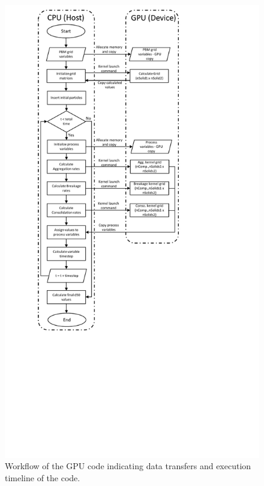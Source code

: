 \documentclass[preprint,10pt,authoryear,review]{elsarticle}
\begin{document}
\begin{linenumbers}
\begin{figure}
\centering
\includegraphics[scale=0.8,trim=200 250 300 200]{GPU_flowchart.pdf}
\caption{Workflow of the GPU code indicating data transfers and execution timeline of the code.}
\label{fig:mtd_gpu_imp}
\end{figure}



\end{linenumbers}
\end{document}
